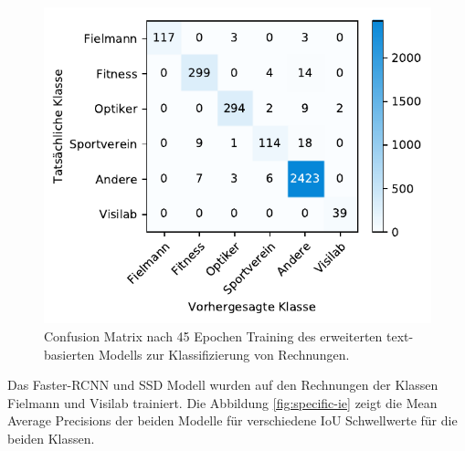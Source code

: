 \begin{figure}[h!] 
    \captionsetup{width=.9\linewidth}
    \caption[Confusion Matrix des um die Klassen Fielmann und Visilab ergänzten text-basierten Modells zur Klassifizierung von Rechnungen]{Confusion Matrix nach 45 Epochen Training des erweiterten text-basierten Modells zur Klassifizierung von Rechnungen.}
    \label{fielmann-cm}
    \centering
    \includegraphics[scale=1]{graphics/matplot/class__fielmann__cm_44.pdf}
\end{figure}

Das Faster-RCNN und SSD Modell wurden auf den Rechnungen der Klassen Fielmann und Visilab trainiert. Die Abbildung \ref{fig:specific-ie} zeigt die Mean Average Precisions der beiden Modelle für verschiedene IoU Schwellwerte für die beiden Klassen.

